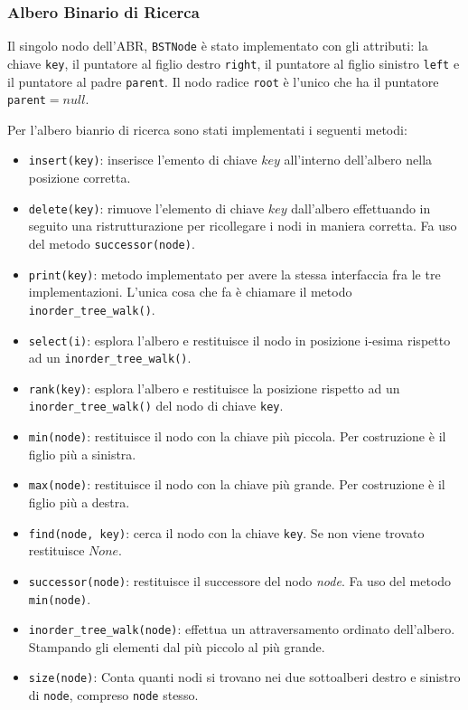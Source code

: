 \subsubsection*{Albero Binario di Ricerca}
Il singolo nodo dell'ABR, \texttt{BSTNode} è stato implementato con gli attributi: la chiave \texttt{key}, il puntatore al figlio destro \texttt{right}, il puntatore al figlio sinistro \texttt{left} e il puntatore al padre \texttt{parent}. Il nodo radice \texttt{root} è l'unico che ha il puntatore \texttt{parent}$=null$.


Per l'albero bianrio di ricerca sono stati implementati i seguenti metodi:
\begin{itemize}
	\item \texttt{insert(key)}: inserisce l'emento di chiave $key$ all'interno dell'albero nella posizione corretta.
	\item \texttt{delete(key)}: rimuove l'elemento di chiave $key$ dall'albero effettuando in seguito una ristrutturazione per ricollegare i nodi in maniera corretta. Fa uso del metodo \texttt{successor(node)}.
	\item \texttt{print(key)}: metodo implementato per avere la stessa interfaccia fra le tre implementazioni. L'unica cosa che fa è chiamare il metodo \texttt{inorder\_tree\_walk()}.
	\item \sloppy \texttt{select(i)}: esplora l'albero e restituisce il nodo in posizione i-esima rispetto ad un \texttt{inorder\_tree\_walk()}.
	\item \texttt{rank(key)}: esplora l'albero e restituisce la posizione rispetto ad un \texttt{inorder\_tree\_walk()} del nodo di chiave \texttt{key}.
	\item \texttt{min(node)}: restituisce il nodo con la chiave più piccola. Per costruzione è il figlio più a sinistra.
	\item \texttt{max(node)}: restituisce il nodo con la chiave più grande. Per costruzione è il figlio più a destra.
	\item \texttt{find(node, key)}: cerca il nodo con la chiave \texttt{key}. Se non viene trovato restituisce $None$.
	\item \texttt{successor(node)}: restituisce il successore del nodo \textit{node}. Fa uso del metodo \texttt{min(node)}.
	\item \texttt{inorder\_tree\_walk(node)}: effettua un attraversamento ordinato dell'albero. Stampando gli elementi dal più piccolo al più grande.
	\item \texttt{size(node)}: Conta quanti nodi si trovano nei due sottoalberi destro e sinistro di \texttt{node}, compreso \texttt{node} stesso.
\end{itemize}

